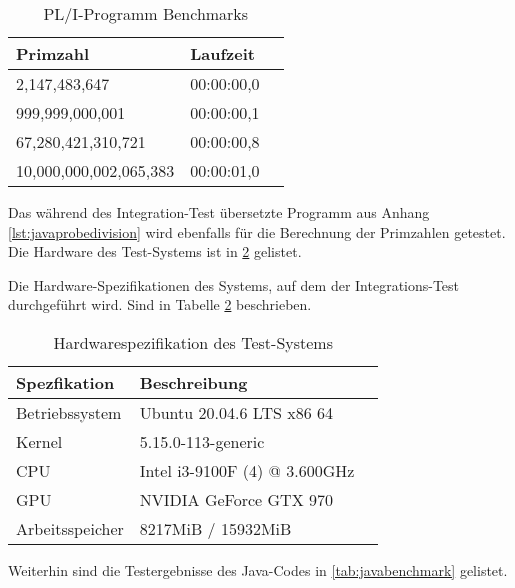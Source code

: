 \begin{table}[h]\label{tab:plibenchmark}
	\centering
	\begin{tabular}[h]{|l|l|l|}
		\hline
		\textbf{Primzahl} & \textbf{Laufzeit}  \\
		\hline
		2,147,483,647 & 00:00:00,0 \\
		
		999,999,000,001 & 00:00:00,1  \\
		
		67,280,421,310,721 & 00:00:00,8 \\
		
		10,000,000,002,065,383 & 00:00:01,0 \\
		\hline
	\end{tabular}
	\caption{PL/I-Programm Benchmarks}
\end{table}


Das während des Integration-Test übersetzte Programm aus Anhang \ref{lst:javaprobedivision} wird ebenfalls für die Berechnung der Primzahlen 
getestet. Die Hardware des Test-Systems ist in \ref{tab:hardwartable} gelistet. 

Die Hardware-Spezifikationen des Systems, auf dem der Integrations-Test durchgeführt wird. Sind in Tabelle \ref{tab:hardwartable} beschrieben.

\begin{table}[h]\label{tab:hardwartable}
	\centering
	\begin{tabular}[h]{|l|l|l|}
		\hline
		\textbf{Spezfikation} & \textbf{Beschreibung}  \\
		\hline
		Betriebssystem & Ubuntu 20.04.6 LTS x86 64 \\
		\hline
		Kernel & 5.15.0-113-generic  \\
		\hline
		CPU & Intel i3-9100F (4) @ 3.600GHz \\
		\hline
		GPU & NVIDIA GeForce GTX 970  \\
		\hline
		Arbeitsspeicher & 8217MiB / 15932MiB \\
		\hline
		
	\end{tabular}
	\caption{Hardwarespezifikation des Test-Systems}
\end{table}


Weiterhin sind die Testergebnisse des Java-Codes in \ref{tab:javabenchmark} gelistet.

